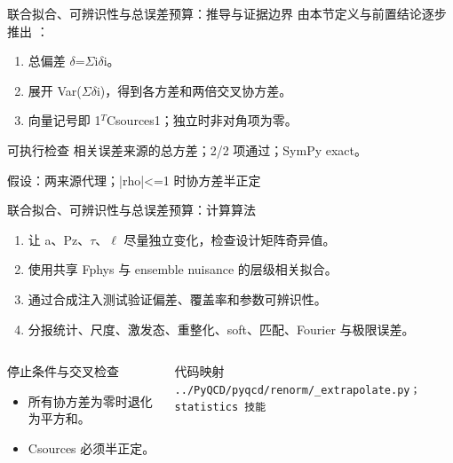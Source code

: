 \begin{frame}[t]{联合拟合、可辨识性与总误差预算：推导与证据边界}
\footnotesize
{}\quad 由本节定义与前置结论逐步推出 ：
\begin{enumerate}
\item 总偏差 \ensuremath{\delta}=\ensuremath{\Sigma}i\ensuremath{\delta}i。
\item 展开 Var(\ensuremath{\Sigma}\ensuremath{\delta}i)，得到各方差和两倍交叉协方差。
\item 向量记号即 1\ensuremath{^{T}}Csources1；独立时非对角项为零。
\end{enumerate}\begin{block}{可执行检查}
\quad 相关误差来源的总方差；2/2 项通过；SymPy exact。
\par\scriptsize 假设：两来源代理；|rho|<=1 时协方差半正定
\end{block}
\end{frame}

\begin{frame}[t]{联合拟合、可辨识性与总误差预算：计算算法}
\footnotesize
{}\begin{enumerate}
\item 让 a、Pz、\ensuremath{\tau}、\ensuremath{\ell} 尽量独立变化，检查设计矩阵奇异值。
\item 使用共享 Fphys 与 ensemble nuisance 的层级相关拟合。
\item 通过合成注入测试验证偏差、覆盖率和参数可辨识性。
\item 分报统计、尺度、激发态、重整化、soft、匹配、Fourier 与极限误差。
\end{enumerate}\begin{columns}[T,onlytextwidth]
\begin{block}{停止条件与交叉检查}\scriptsize\begin{itemize}
\item[\CheckMark] 所有协方差为零时退化为平方和。
\item[\CheckMark] Csources 必须半正定。
\end{itemize}\end{block}
\begin{block}{代码映射}
\scriptsize \texttt{.\allowbreak{}.\allowbreak{}/\allowbreak{}PyQCD/\allowbreak{}pyqcd/\allowbreak{}renorm/\allowbreak{}\_\allowbreak{}extrapolate.\allowbreak{}py；statistics 技能}
\end{block}\end{columns}\end{frame}

